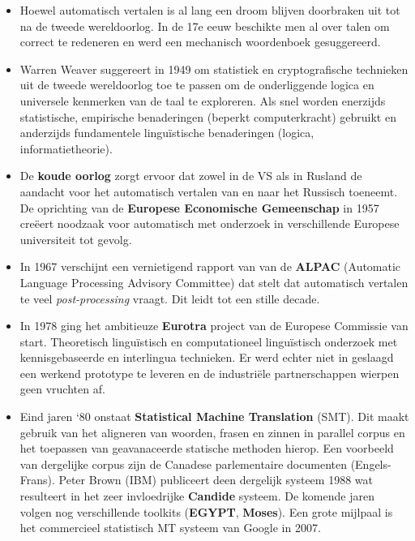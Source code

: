 \documentclass[../main.tex]{subfiles}
\begin{document}
\begin{solution}
\begin{itemize}
	\item Hoewel automatisch vertalen is al lang een droom blijven doorbraken uit tot na de tweede wereldoorlog. In de 17e eeuw beschikte men al over talen om correct te redeneren en werd een mechanisch woordenboek gesuggereerd.
	\item Warren Weaver suggereert in 1949 om statistiek en cryptografische technieken uit de tweede wereldoorlog toe te passen om de onderliggende logica en universele kenmerken van de taal te exploreren. Als snel worden enerzijds statistische, empirische benaderingen (beperkt computerkracht) gebruikt en anderzijds fundamentele linguïstische benaderingen (logica, informatietheorie).
	\item De \textbf{koude oorlog} zorgt ervoor dat zowel in de VS als in Rusland de aandacht voor het automatisch vertalen van en naar het Russisch toeneemt. De oprichting van de \textbf{Europese Economische Gemeenschap} in 1957 creëert noodzaak voor automatisch met onderzoek in verschillende Europese universiteit tot gevolg.
	\item In 1967 verschijnt een vernietigend rapport van van de \textbf{ALPAC} (Automatic Language Processing Advisory Committee) dat stelt dat automatisch vertalen te veel \emph{post-processing} vraagt. Dit leidt tot een stille decade.
	\item In 1978 ging het ambitieuze \textbf{Eurotra} project van de Europese Commissie van start. Theoretisch lingu\"istisch en computationeel lingu\"istisch onderzoek met kennisgebaseerde en interlingua technieken. Er werd echter niet in geslaagd een werkend prototype te leveren en de industri\"ele partnerschappen wierpen geen vruchten af.
	\item Eind jaren `80 onstaat \textbf{Statistical Machine Translation} (SMT). Dit maakt gebruik van het aligneren van woorden, frasen en zinnen in parallel corpus en het toepassen van geavanaceerde statische methoden hierop. Een voorbeeld van dergelijke corpus zijn de Canadese parlementaire documenten (Engels-Frans). Peter Brown (IBM) publiceert deen dergelijk systeem 1988 wat resulteert in het zeer invloedrijke \textbf{Candide} systeem. De komende jaren volgen nog verschillende toolkits (\textbf{EGYPT}, \textbf{Moses}). Een grote mijlpaal is het commercieel statistisch MT systeem van Google in 2007.
\end{itemize}
\end{solution}
\end{document}
